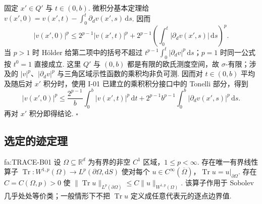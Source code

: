 \begin{FAProof}
固定 \(\displaystyle x'\in Q'\) 与 \(\displaystyle t\in(0,b)\). 微积分基本定理给 \(\displaystyle v(x',0)=v(x',t)-\int_0^t\partial_dv(x',s)\,\mathrm{d}s\). 因而
\[
|v(x',0)|^p
\leqslant
2^{p-1}|v(x',t)|^p
+
2^{p-1}\left(\int_0^t|\partial_dv(x',s)|\,\mathrm{d}s\right)^p.
\]
当 \(\displaystyle p>1\) 时 Hölder 给第二项中的括号不超过 \(\displaystyle t^{p-1}\int_0^t|\partial_dv|^p\,\mathrm{d}s\)；\(\displaystyle p=1\) 时同一公式按 \(\displaystyle t^0=1\) 直接成立. 这里 \(\displaystyle Q'\) 与 \(\displaystyle(0,b)\) 都是有限的欧氏测度空间，故 \(\displaystyle\sigma\)-有限；涉及的 \(\displaystyle|v|^p\)、\(\displaystyle|\partial_dv|^p\) 与三角区域示性函数的乘积均非负可测. 因而对 \(\displaystyle t\in(0,b)\) 平均及随后对 \(\displaystyle x'\) 积分时，使用 I-01 已建立的乘积积分接口中的 Tonelli 部分，得到
\[
|v(x',0)|^p
\leqslant
\frac{2^{p-1}}b\int_0^b|v(x',t)|^p\,\mathrm{d}t
+
2^{p-1}b^{p-1}\int_0^b|\partial_dv(x',s)|^p\,\mathrm{d}s.
\]
再对 \(\displaystyle x'\) 积分即得结论.
\hfill\(\square\)
\end{FAProof}

\subsection{选定的迹定理}

\begin{FATheorem}{fa:TRACE-B01}
设 \(\displaystyle\Omega\subseteq\mathbb R^d\) 为有界的非空 \(\displaystyle C^1\) 区域，\(\displaystyle1\leqslant p<\infty\). 存在唯一有界线性算子 \(\displaystyle \operatorname{Tr}:W^{1,p}(\Omega) \longrightarrow L^p(\partial\Omega,\mathrm{d}S)\)
使对每个 \(\displaystyle u\in C^\infty(\overline\Omega)\)，\(\displaystyle\operatorname{Tr}u=u|_{\partial\Omega}\). 存在 \(\displaystyle C=C(\Omega,p)>0\) 使 \(\displaystyle \|\operatorname{Tr}u\|_{L^p(\partial\Omega)} \leqslant C\|u\|_{W^{1,p}(\Omega)}.\)
该算子作用于 Sobolev 几乎处处等价类；一般情形下不把 \(\displaystyle\operatorname{Tr}u\) 定义成任意代表元的逐点边界值.
\end{FATheorem}

